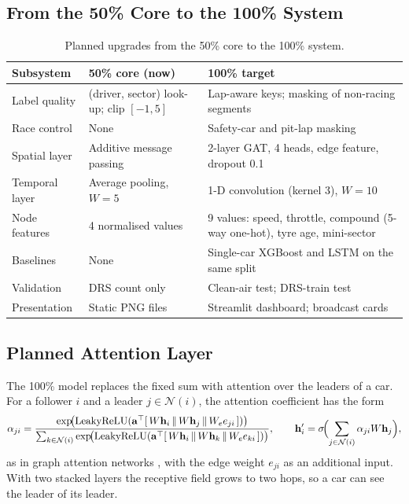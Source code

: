 \documentclass[11pt,a4paper]{article}
\begin{document}
\subsection{From the 50\% Core to the 100\% System}
\begin{table}[H]
\centering
\caption{Planned upgrades from the 50\% core to the 100\% system.}
\label{tab:roadmap}
\small
\begin{tabularx}{\linewidth}{@{}lXX@{}}
\toprule
\textbf{Subsystem} & \textbf{50\% core (now)} & \textbf{100\% target} \\
\midrule
Label quality & (driver, sector) look-up; clip $[-1,5]$ & Lap-aware keys; masking of non-racing segments \\
Race control & None & Safety-car and pit-lap masking \\
Spatial layer & Additive message passing & 2-layer GAT, 4 heads, edge feature, dropout 0.1 \\
Temporal layer & Average pooling, $W=5$ & 1-D convolution (kernel 3), $W=10$ \\
Node features & 4 normalised values & 9 values: speed, throttle, compound (5-way one-hot), tyre age, mini-sector \\
Baselines & None & Single-car XGBoost and LSTM on the same split \\
Validation & DRS count only & Clean-air test; DRS-train test \\
Presentation & Static PNG files & Streamlit dashboard; broadcast cards \\
\bottomrule
\end{tabularx}
\end{table}

\subsection{Planned Attention Layer}
The 100\% model replaces the fixed sum with attention over the leaders of a
car. For a follower $i$ and a leader $j \in \mathcal{N}(i)$, the attention
coefficient has the form
\begin{equation}
\alpha_{ji} = \frac{\exp\!\bigl(\operatorname{LeakyReLU}(\mathbf{a}^{\top}[\,W\mathbf{h}_i \,\|\, W\mathbf{h}_j \,\|\, W_e e_{ji}\,])\bigr)}
{\sum_{k \in \mathcal{N}(i)} \exp\!\bigl(\operatorname{LeakyReLU}(\mathbf{a}^{\top}[\,W\mathbf{h}_i \,\|\, W\mathbf{h}_k \,\|\, W_e e_{ki}\,])\bigr)},
\qquad
\mathbf{h}_i' = \sigma\!\Bigl(\sum_{j\in\mathcal{N}(i)} \alpha_{ji} W \mathbf{h}_j\Bigr),
\end{equation}
as in graph attention networks \cite{velickovic2018}, with the edge weight
$e_{ji}$ as an additional input. With two stacked layers the receptive field
grows to two hops, so a car can see the leader of its leader.
\end{document}
